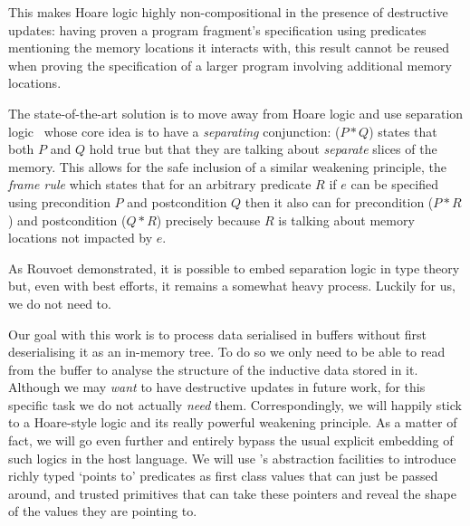 This makes Hoare logic highly non-compositional in the presence of
destructive updates: having proven a program
fragment's specification using predicates mentioning the memory locations
it interacts with, this result cannot be reused when proving the specification
of a larger program involving additional memory locations.

The state-of-the-art solution is to move away from Hoare logic and use
separation logic~\citep{DBLP:conf/lics/Reynolds02,DBLP:journals/cacm/OHearn19,DBLP:books/hal/Chargueraud23,MANUAL:book/sfoundations/Chargueraud23}
whose core idea is to have a \emph{separating} conjunction: ($P \ast Q$)
states that both $P$ and $Q$ hold true but that they are talking about
\emph{separate} slices of the memory.
%
This allows for the safe inclusion of a similar weakening principle,
the \emph{frame rule} which states that for an arbitrary predicate $R$
if $e$ can be specified using precondition $P$ and postcondition $Q$
then it also can for precondition ($P \ast R$) and postcondition ($Q \ast R$)
precisely because $R$ is talking about memory locations not impacted by $e$.

As Rouvoet\citeyearpar{DBLP:phd/basesearch/Rouvoet21}
demonstrated, it is possible to embed separation logic in
type theory but, even with best efforts, it remains a somewhat
heavy process. Luckily for us, we do not need to.

Our goal with this work is to process data serialised in buffers
without first deserialising it as an in-memory tree.
To do so we only need to be able to read from the buffer to
analyse the structure of the inductive data stored in it.
%
Although we may \emph{want} to have destructive updates in future
work, for this specific task we do not actually \emph{need} them.
%
Correspondingly, we will happily stick to a Hoare-style logic and
its really powerful weakening principle.
%
As a matter of fact, we will go even further and entirely bypass the
usual explicit embedding of such logics in the host language.
%
We will use \idris{}'s abstraction facilities to introduce richly typed
`points to' predicates as first class values that can just be passed
around, and trusted primitives that can take these pointers and reveal
the shape of the values they are pointing to.

